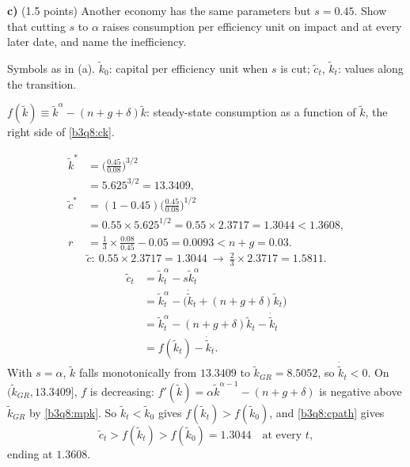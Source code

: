 \textbf{c)} (1.5 points) Another economy has the same parameters but $s=0.45$. Show that cutting $s$ to $\alpha$ raises consumption per
efficiency unit on impact and at every later date, and name the inefficiency.
\resolespaco
\begin{sol}
\begin{notacao}
\item Symbols as in (a). $\tilde k_0$: capital per efficiency unit when $s$ is cut; $\tilde c_t$, $\tilde k_t$: values along the transition.
\item $f(\tilde k)\equiv\tilde k^{\alpha}-(n+g+\delta)\tilde k$: steady-state consumption as a function of $\tilde k$, the right side of \eqref{b3q8:ck}.
\end{notacao}
\begin{align*}
\tilde k^*&=\Big(\frac{0.45}{0.08}\Big)^{3/2}\\
&=5.625^{3/2}=13.3409,\\
\tilde c^*&=(1-0.45)\Big(\frac{0.45}{0.08}\Big)^{1/2}\\
&=0.55\times5.625^{1/2}=0.55\times2.3717=1.3044<1.3608,\\
r&=\tfrac13\times\tfrac{0.08}{0.45}-0.05=0.0093<n+g=0.03 .
\end{align*}
\[
\tilde c:\ 0.55\times2.3717=1.3044\ \longrightarrow\ \tfrac23\times2.3717=1.5811 .
\]
\begin{align}
\tilde c_t&=\tilde k_t^{\alpha}-s\tilde k_t^{\alpha}\nonumber\\
&=\tilde k_t^{\alpha}-\big(\dot{\tilde k}_t+(n+g+\delta)\tilde k_t\big)\nonumber\\
&=\tilde k_t^{\alpha}-(n+g+\delta)\tilde k_t-\dot{\tilde k}_t\nonumber\\
&=f(\tilde k_t)-\dot{\tilde k}_t. \label{b3q8:cpath}
\end{align}
With $s=\alpha$, $\tilde k$ falls monotonically from $13.3409$ to $\tilde k_{GR}=8.5052$, so $\dot{\tilde k}_t<0$. On
$(\tilde k_{GR},13.3409]$, $f$ is decreasing: $f'(\tilde k)=\alpha\tilde k^{\alpha-1}-(n+g+\delta)$ is negative above $\tilde k_{GR}$ by
\eqref{b3q8:mpk}. So $\tilde k_t<\tilde k_0$ gives $f(\tilde k_t)>f(\tilde k_0)$, and \eqref{b3q8:cpath} gives
\[
\tilde c_t>f(\tilde k_t)>f(\tilde k_0)=1.3044\quad\text{at every }t,
\]
ending at $1.3608$.
\end{sol}

